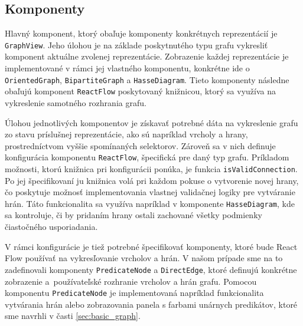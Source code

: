 \subsection{Komponenty}
Hlavný komponent, ktorý obaľuje komponenty konkrétnych reprezentácií je \texttt{GraphView}. Jeho úlohou je na základe poskytnutého typu grafu vykresliť komponent aktuálne zvolenej reprezentácie. Zobrazenie každej reprezentácie je implementované v rámci jej vlastného komponentu, konkrétne ide o \texttt{OrientedGraph}, \texttt{BipartiteGraph} a \texttt{HasseDiagram}. Tieto komponenty následne obaľujú komponent \texttt{ReactFlow} poskytovaný knižnicou, ktorý sa využíva na vykreslenie samotného rozhrania grafu.

Úlohou jednotlivých komponentov je získavať potrebné dáta na vykreslenie grafu zo stavu príslušnej reprezentácie, ako sú napríklad vrcholy a hrany, prostredníctvom vyššie spomínaných selektorov. Zároveň sa v nich definuje konfigurácia komponentu \texttt{ReactFlow}, špecifická pre daný typ grafu. Príkladom možnosti, ktorú knižnica pri konfigurácii ponúka, je funkcia \texttt{isValidConnection}. Po jej špecifikovaní ju knižnica volá pri každom pokuse o vytvorenie novej hrany, čo poskytuje možnosť implementovania vlastnej validačnej logiky pre vytváranie hrán. Táto funkcionalita sa využíva napríklad v komponente \texttt{HasseDiagram}, kde sa kontroluje, či by pridaním hrany ostali zachované všetky podmienky čiastočného usporiadania.

V rámci konfigurácie je tiež potrebné špecifikovať komponenty, ktoré bude React Flow používať na vykresľovanie vrcholov a hrán. V našom prípade sme na to zadefinovali komponenty \texttt{PredicateNode} a \texttt{DirectEdge}, ktoré definujú konkrétne zobrazenie a~používateľské rozhranie vrcholov a hrán grafu. Pomocou komponentu \texttt{PredicateNode} je implementovaná napríklad funkcionalita vytvárania hrán alebo zobrazovania panela s farbami unárnych predikátov, ktoré sme navrhli v časti \ref{sec:basic_graph}.



